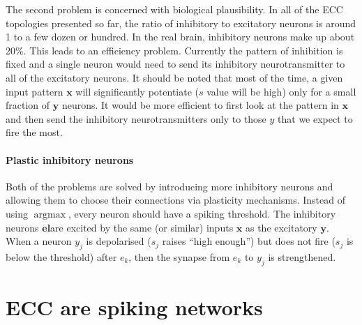 \documentclass[12pt]{article}
\DeclareMathOperator*{\argmax}{argmax}
\begin{document}
The second problem is concerned with biological plausibility. In all of the ECC topologies presented so far, the ratio of inhibitory to excitatory neurons is around 1 to a few dozen or hundred. In the real brain, inhibitory neurons make up about 20\%. This leads to an efficiency problem. Currently the pattern of inhibition is fixed and a single neuron would need to send its inhibitory neurotransmitter to all of the excitatory neurons. It should be noted that most of the time, a given input pattern $\boldsymbol{x}$ will significantly potentiate ($s$ value will be high) only for a small fraction of $\boldsymbol{y}$ neurons. It would be more efficient to first look at the pattern in  $\boldsymbol{x}$ and then send the inhibitory  neurotransmitters only to those $y$ that we expect to fire the most.

\paragraph{Plastic inhibitory neurons}
Both of the problems are solved by introducing more inhibitory neurons and allowing them to choose their connections via plasticity mechanisms. Instead of using $\argmax$, every neuron should have a spiking threshold. The inhibitory neurons $\boldsymbol{el}$are excited by the same (or similar) inputs $\boldsymbol{x}$ as the excitatory $\boldsymbol{y}$. When a neuron $y_j$ is depolarised ($s_j$ raises ``high enough'') but does not fire ($s_j$ is below the threshold) after $e_k$, then the synapse from $e_k$ to $y_j$ is strengthened. 

\section{ECC are spiking networks}
\end{document}
